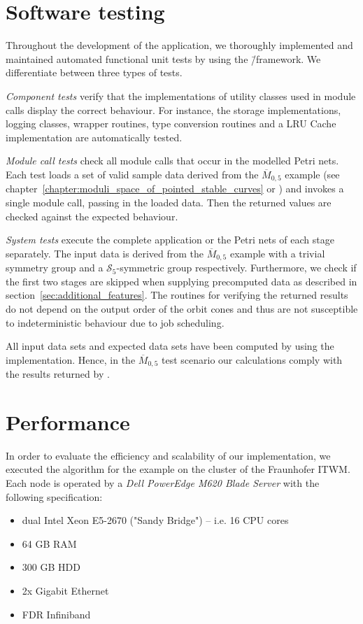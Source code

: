 \section{Software testing}

Throughout the development of the application, we thoroughly implemented and maintained automated functional unit tests by using the \gtest{}\=/framework. We differentiate between three types of tests.

\emph{Component tests} verify that the implementations of utility classes used in module calls display the correct behaviour. For instance, the storage implementations, logging classes, \singular{} wrapper routines, type conversion routines and a LRU Cache implementation are automatically tested.

\emph{Module call tests} check all module calls that occur in the modelled Petri nets. 
Each test loads a set of valid sample data derived from the $\overline{M}_{0,5}$ example (see chapter~\ref{chapter:moduli_space_of_pointed_stable_curves} or \cite[Example 5.2]{gitfan_symmetry}) and invokes a single module call, passing in the loaded data. Then the returned values are checked against the expected behaviour.

\emph{System tests} execute the complete application or the Petri nets of each stage separately. The input data is derived from the $\overline{M}_{0,5}$ example with a trivial symmetry group and a $\mathcal{S}_5$-symmetric group respectively. Furthermore, we check if the first two stages are skipped when supplying precomputed data as described in section~\ref{sec:additional_features}. The routines for verifying the returned results do not depend on the output order of the orbit cones and thus are not susceptible to indeterministic behaviour due to job scheduling.

All input data sets and expected data sets have been computed by using the \gitfanlib{} implementation. Hence, in the $\overline{M}_{0,5}$ test scenario our calculations comply with the results returned by \gitfanlib{}.

\section{Performance}

In order to evaluate the efficiency and scalability of our implementation, we executed the algorithm for the \msix{} example on the cluster of the \ac{Fraunhofer ITWM}. Each node is operated by a \emph{Dell PowerEdge M620 Blade Server} with the following specification:
\begin{itemize}
	\item dual Intel Xeon E5-2670 ("Sandy Bridge") -- i.e. 16 CPU cores
	\item 64 GB RAM
	\item 300 GB HDD
	\item 2x Gigabit Ethernet
	\item FDR Infiniband
\end{itemize}

